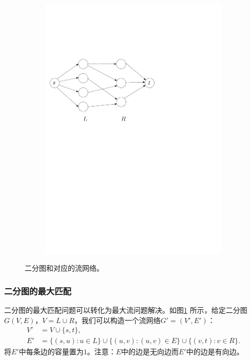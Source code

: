 \documentclass[a4paper]{ctexbook}
\begin{document}
\begin{figure}
\begin{subfigure}[t]{0.4\linewidth}
      \includegraphics[scale=0.5]{figures/bipartite-network}
      \caption{}
    \end{subfigure}
    \caption{二分图和对应的流网络。}
    \label{Fig:bipartite-network}
  \end{figure}

  \subsubsection{二分图的最大匹配}
  二分图的最大匹配问题可以转化为最大流问题解决。如图\ref{Fig:bipartite-network} 所示，给定二分图$G(V,E)$，$V=L\cup R$，我们可以构造一个流网络$G'=(V',E')$：
  \begin{align*}
    V'&=V\cup\{s,t\},\\
    E'&=\{(s,u)\colon u\in L\}\cup\{(u,v)\colon(u,v)\in E\}\cup\{(v,t)\colon v\in R\}.
  \end{align*}
  将$E'$中每条边的容量置为$1$。注意：$E$中的边是无向边而$E'$中的边是有向边。
\end{document}
